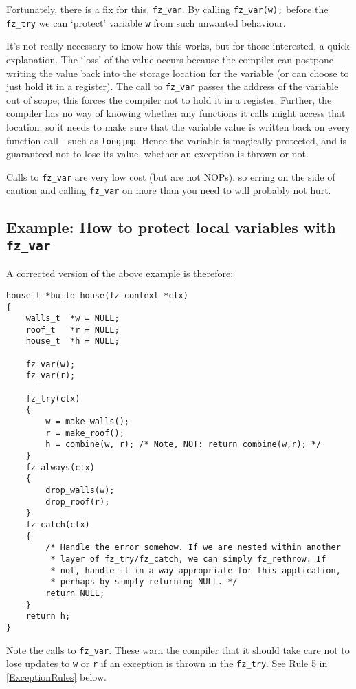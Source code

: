 \documentclass[oneside]{book}
\newcommand{\rjwref}[1] {\autoref{#1} \nameref{#1}}
\begin{document}
Fortunately, there is a fix for this, \texttt{fz\_var}. By calling \texttt{fz\_var(w);} before the \texttt{fz\_try} we can `protect' variable \texttt{w} from such unwanted behaviour.

It's not really necessary to know how this works, but for those interested, a quick explanation. The `loss' of the value occurs because the compiler can postpone writing the value back into the storage location for the variable (or can choose to just hold it in a register). The call to \texttt{fz\_var} passes the address of the variable out of scope; this forces the compiler not to hold it in a register. Further, the compiler has no way of knowing whether any functions it calls might access that location, so it needs to make sure that the variable value is written back on every function call - such as \texttt{longjmp}. Hence the variable is magically protected, and is guaranteed not to lose its value, whether an exception is thrown or not.

Calls to \texttt{fz\_var} are very low cost (but are not NOPs), so erring on the side of caution and calling \texttt{fz\_var} on more than you need to will probably not hurt.

\subsection{Example: How to protect local variables with \texttt{fz\_var}}

A corrected version of the above example is therefore:

\begin{lstlisting}
house_t *build_house(fz_context *ctx)
{
    walls_t  *w = NULL;
    roof_t   *r = NULL;
    house_t  *h = NULL;
    
    fz_var(w);
    fz_var(r);
    
    fz_try(ctx)
    {
        w = make_walls();
        r = make_roof();
        h = combine(w, r); /* Note, NOT: return combine(w,r); */
    }
    fz_always(ctx)
    {
        drop_walls(w);
        drop_roof(r);
    }
    fz_catch(ctx)
    {
        /* Handle the error somehow. If we are nested within another
         * layer of fz_try/fz_catch, we can simply fz_rethrow. If
         * not, handle it in a way appropriate for this application,
         * perhaps by simply returning NULL. */
        return NULL;
    }
    return h;
}
\end{lstlisting}

Note the calls to \texttt{fz\_var}. These warn the compiler that it should take care not to lose updates to \texttt{w} or \texttt{r} if an exception is thrown in the \texttt{fz\_try}. See Rule 5 in \rjwref{ExceptionRules} below.
\end{document}

